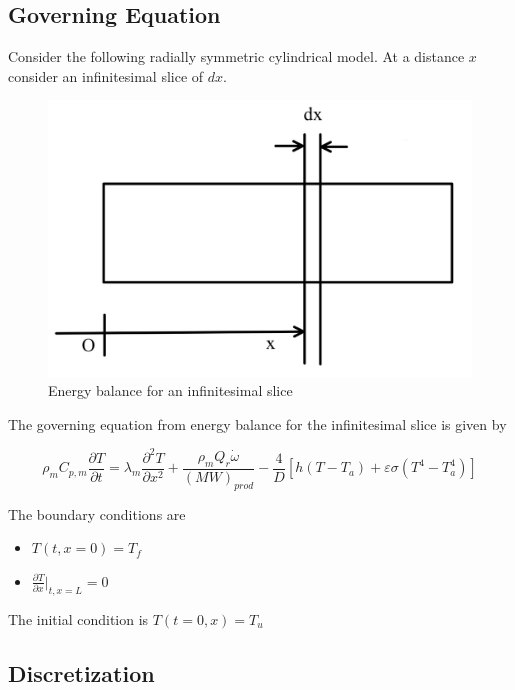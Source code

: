 \documentclass[../main.tex]{subfiles}
\begin{document}
\subsection{Governing Equation}

Consider the following radially symmetric cylindrical model. At a distance $x$ consider an infinitesimal slice of $dx$.

\begin{figure}[h]
    \centering
    \includegraphics[scale=0.15]{images/schematic.png}
    \caption{Energy balance for an infinitesimal slice}
    \label{fig:my_label}
\end{figure}

\noindent The governing equation from energy balance for the infinitesimal slice is given by

\begin{equation}
    \rho_m C_{p,m} \frac{\partial T}{\partial t} =
    \lambda_m \frac{\partial^2 T}{\partial x^2}
    + \frac{\rho_m Q_r \dot{\omega}}{(MW)_{prod}}
    - \frac{4}{D} \left[ h \left( T - T_a \right) + \varepsilon \sigma \left( T^4 - T_a^4 \right) \right]
\end{equation}

\noindent The boundary conditions are

\begin{itemize}
    \item $T \left(t, x = 0 \right) = T_f$
    \item $\frac{\partial T}{\partial x} |_{t, x = L} = 0$
\end{itemize}

\noindent The initial condition is $T \left( t = 0, x \right) = T_u$

\subsection{Discretization}
\end{document}
